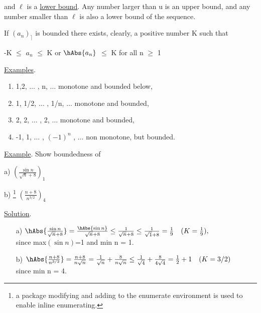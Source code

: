 \documentclass[12pt]{article}
\begin{document}

\noindent and $\ell$ is a \underline{lower bound}. Any number larger than u is an upper bound, and any number smaller than $\ell$ is also a lower bound of the sequence.

If  $(a_n )_\rceil$ is bounded there exists, clearly, a positive number K such that

	\begin{center} %
		-K $\leq$
		$a_n$ $\leq$ 
		K or $\hAbs{a_n}$ $\leq$ 
		K for all n $\geq$ 1
	\end{center}

\underline{Examples}.

	\begin{enumerate} %
	\item 1,2, $\ldots$ , n, $\ldots$ monotone and bounded below,
	\item 1, 1/2, $\ldots$ , 1/n, $\ldots$ monotone and bounded,
	\item 2, 2, $\ldots$ , 2, $\ldots$ monotone and bounded,
	\item -1, 1, $\ldots$ , $(-1)^n$ , $\ldots$ non monotone, but bounded. 
	\end{enumerate}

\underline{Example}. Show boundedness of
\\

	\begin{enumerate*} %
	\item[a)]$ (\frac
			{\sin n}
			{\sqrt{n}+8})_1$ 
	\indent\indent\indent\indent\indent 
	\item[b)]\footnote{a package modifying and adding to the enumerate environment is used to enable inline enumerating.} %
			$(\frac
			{n+8}
			{n^{3/2}})_4$ \\
	\end{enumerate*}

\underline{Solution}.
\\

	\begin{enumerate} %
	\item[a)] $\hAbs
			{\frac
			{\sin n}
			{\sqrt{n}+8}} = \frac
						{\hAbs
						{\sin n}}
						{\sqrt{n}+8} \leq 
						\frac
						{1}
						{\sqrt{n}+8} \leq 
						\frac
						{1}
						{\sqrt{1}+8} = 
						\frac
						{1}
						{9} 
						\quad (K=\frac{1}{9}),$ \\

	since max$(\sin n)$=1 and min n = 1. \\

	\item[b)] $\hAbs
			{\frac
			{n+8}
			{n^{3/2}}}= 
			\frac
			{n+8}
			{n\sqrt{n}} = 
			\frac
			{1}
			{\sqrt{n}} + 
			\frac
			{8}
			{n\sqrt{n}} \leq 
			\frac
			{1}
			{\sqrt{4}} + 
			\frac
			{8}
			{4\sqrt{4}} = 
			\frac
			{1}
			{2} + 
			1 \quad (K = 3/2)$ \\

	since min n = 4.
	\end{enumerate}
\end{document}
